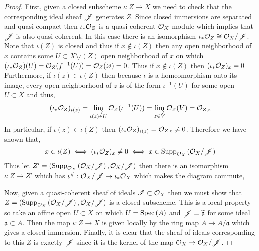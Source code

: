 \documentclass[12pt]{article}
\begin{document}
\begin{proof}
First, given a closed subscheme $\iota : Z \to X$ we need to check that the corresponding ideal sheaf $\mathscr{J}$ generates $Z$. Since closed immersions are separated and quasi-compact then $\iota_* \mathcal{O}_{Z}$ is a quasi-coherent $\mathcal{O}_{X}$-module which implies that $\mathscr{J}$ is also quasi-coherent. In this case there is an isomorphism $\iota_* \mathcal{O}_{Z} \cong  \mathcal{O}_{X} / \mathscr{J}$. Note that $\iota(Z)$ is closed and thus if $x \notin \iota(Z)$ then any open neighborhood of $x$ contains some $U \subset X \setminus \iota(Z)$ open neighborhood of $x$ on which $(\iota_* \mathcal{O}_{Z})(U) = \mathcal{O}_{Z}(f^{-1}(U)) = \mathcal{O}_{Z}(\varnothing) = 0$. Thus if $x \notin \iota(Z)$ then $(\iota_* \mathcal{O}_{Z})_x = 0$ Furthermore, if $\iota(z) \in \iota(Z)$ then because $\iota$ is a homeomorphism onto its image, every open neighborhood of $z$ is of the form $\iota^{-1}(U)$ for some open $U \subset X$ and thus,
\[ (\iota_* \mathcal{O}_{Z})_{\iota(z)} = \varinjlim_{\iota(z) \in U} \mathcal{O}_{Z}(\iota^{-1}(U)) = \varinjlim_{z \in V} \mathcal{O}_{Z}(V) = \mathcal{O}_{Z, z}  \] 
In particular, if $\iota(z) \in \iota(Z)$ then $(\iota_* \mathcal{O}_{Z})_{\iota(z)} = \mathcal{O}_{Z, z} \neq 0$. Therefore we have shown that,
\[ x \in \iota(Z) \iff (\iota_* \mathcal{O}_{Z})_x \neq 0 \iff x \in \mathrm{Supp}_{\mathcal{O}_{X}}\left(\mathcal{O}_{X} / \mathscr{J} \right) \]
Thus let $Z' = (\mathrm{Supp}_{\mathcal{O}_{X}}\left(\mathcal{O}_{X} / \mathscr{J} \right), \mathcal{O}_{X} / \mathscr{J})$ then there is an isomorphism $\iota : Z \to Z'$ which has $\iota^\# : \mathcal{O}_{X} / \mathscr{J} \to \iota_* \mathcal{O}_{X}$ which makes the diagram commute,
\begin{center}
\end{center}
Now, given a quasi-coherent sheaf of ideals $\mathscr{I} \subset \mathcal{O}_{X}$ then we must show that $Z = (\mathrm{Supp}_{\mathcal{O}_{X}}\left(\mathcal{O}_{X} / \mathscr{J} \right), \mathcal{O}_{X} / \mathscr{J})$ is a closed subscheme. This is a local property so take an affine open $U \subset X$ on which $U = \mathrm{Spec}\left( A \right)$ and $\mathscr{J} = \widetilde{\mathfrak{a}}$ for some ideal $\mathfrak{a} \subset A$. Then the map $\iota : Z \to X$ is given locally by the ring map $A \to A / \mathfrak{a}$ which gives a closed immersion. Finally, it is clear that the sheaf of ideals corresponding to this $Z$ is exactly $\mathscr{J}$ since it is the kernel of the map $\mathcal{O}_{X} \to \mathcal{O}_{X} / \mathscr{J}$.  
\end{proof}
\end{document}
